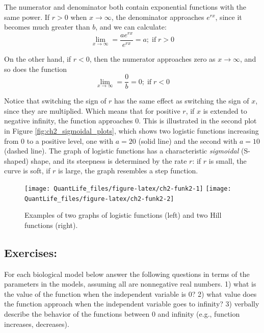 \documentclass[
]{book}
\begin{document}
The numerator and denominator both contain exponential functions with the same power. If \(r>0\) when \(x \to \infty\), the denominator approaches \(e^{rx}\), since it becomes much greater than \(b\), and we can calculate:
\[  \lim_{x \to \infty}  =  \frac{a e^{rx} }{e^{rx}} = a; \; \mathrm{if} \; r>0 \]

On the other hand, if \(r<0\), then the numerator approaches zero as \(x \to \infty\), and so does the function
\[  \lim_{x \to \infty}  =  \frac{0}{b} = 0; \; \mathrm{if} \; r<0 \]

Notice that switching the sign of \(r\) has the same effect as switching the sign of \(x\), since they are multiplied. Which means that for positive \(r\), if \(x\) is extended to negative infinity, the function approaches 0. This is illustrated in the second plot in Figure \ref{fig:ch2_sigmoidal_plots}, which shows two logistic functions increasing from 0 to a positive level, one with \(a=20\) (solid line) and the second with \(a=10\) (dashed line). The graph of logistic functions has a characteristic \emph{sigmoidal} (S-shaped) shape, and its steepness is determined by the rate \(r\): if \(r\) is small, the curve is soft, if \(r\) is large, the graph resembles a step function.

\begin{figure}

{\centering \texttt{[image: QuantLife\_files/figure-latex/ch2-funk2-1]} \texttt{[image: QuantLife\_files/figure-latex/ch2-funk2-2]} 

}

\caption{Examples of two graphs of logistic functions (left) and two Hill functions (right).}\label{fig:ch2-funk2}
\end{figure}

\hypertarget{exercises-2}{%
\subsection{Exercises:}\label{exercises-2}}

For each biological model below answer the following questions in terms of the parameters in the models, assuming all are nonnegative real numbers. 1) what is the value of the function when the independent variable is 0? 2) what value does the function approach when the independent variable goes to infinity? 3) verbally describe the behavior of the functions between 0 and infinity (e.g., function increases, decreases).
\end{document}
